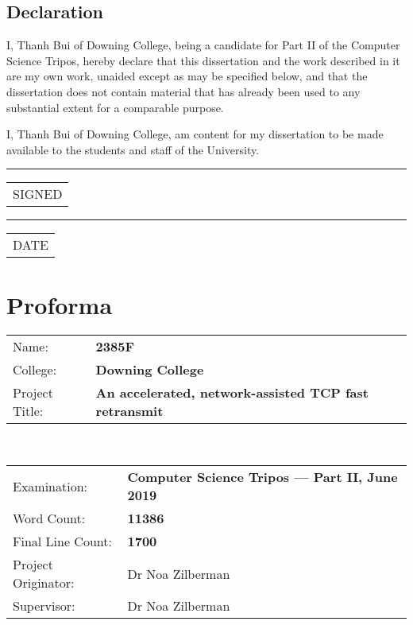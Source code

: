 \section*{Declaration}

I, Thanh Bui of Downing College, being a candidate for Part II of the Computer Science Tripos, hereby declare that this dissertation and the work described in it are my own work, unaided except as may be specified below, and that the dissertation does not contain material that has already been used to any substantial extent for a comparable purpose.

I, Thanh Bui of Downing College, am content for my dissertation to be made available to the students and staff of the University. 

\begin{minipage}[t]{0.4\textwidth}
	\vspace*{1.5cm}  %
	\hrule
	\vspace{1mm} %
	\begin{tabular}[t]{l}
		SIGNED
	\end{tabular}
\end{minipage} 
\hspace{2cm}
\begin{minipage}[t]{0.4\textwidth}
	\vspace*{1.5cm}  %
	\hrule
	\vspace{1mm} %
	\begin{tabular}[t]{l}
		DATE
	\end{tabular}
\end{minipage}

\chapter*{Proforma}

{\large
\begin{tabular}{ l@{\hskip 3.25em} p{11cm}}
	Name:               & \bf 2385F \\
	College:            & \bf Downing College \\
	Project Title:      & \bf An accelerated, network-assisted TCP fast retransmit \\
\end{tabular}
}
\\
{\large
\begin{tabular}{ l p{11.5cm}}
	Examination:        & \bf Computer Science Tripos --- Part II, June 2019  \\
	Word Count:         & \bf 11386\footnotemark[1] \\ 
	Final Line Count: & \bf 1700\footnotemark[2] \\ 
	Project Originator: & Dr Noa Zilberman               \\
	Supervisor:         & Dr Noa Zilberman             		\\ 
\end{tabular}
}

